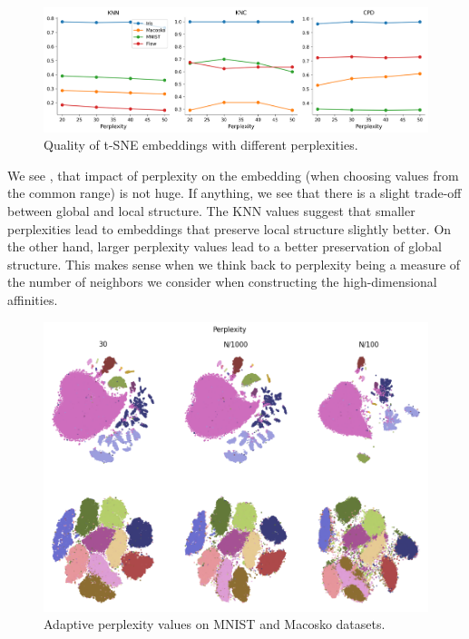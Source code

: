\begin{figure}[h]
    \centering 
        \includegraphics[width=\linewidth]{../code/figures/perp_fixed_3_quality_measures.png}
        \caption{Quality of t-SNE embeddings with different perplexities.}
    \label{fig:perp_fixed_quality}
\end{figure}
We see ,  that impact of perplexity on the embedding (when choosing values from the common range) is not huge. 
If anything, we see that there is a slight trade-off between global and local structure. 
The KNN values suggest that smaller perplexities lead to embeddings that preserve local structure slightly better. 
On the other hand, larger perplexity values lead to a better preservation of global structure. 
This makes sense when we think back to perplexity being a measure of the number of neighbors we consider when constructing the high-dimensional affinities. 

\begin{figure}[h]
    \centering 
        \includegraphics[width=\linewidth]{../code/figures/perp_adapt_embedding_grid_tab20b.png}
        \caption{Adaptive perplexity values on MNIST and Macosko datasets.}
    \label{fig:perp_adapt_grid}
\end{figure}

